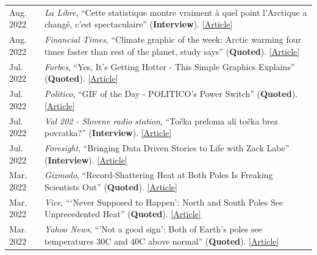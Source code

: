 \documentclass[margin,line,palatino,courier,10pt]{res}
\begin{document}
\begin{resume}
\begin{tabular}{@{}p{0.9in}p{4in}}
\end{tabular}
\begin{tabular}{@{}p{0.9in}p{4in}}
Aug. 2022 & \textit{La Libre}, ``Cette statistique montre vraiment \`{a} quel point l'Arctique a chang\'{e}, c'est spectaculaire'' (\textbf{Interview}). \href{https://www.lalibre.be/planete/environnement/2022/08/17/cette-statistique-montre-vraiment-a-quel-point-larctique-a-change-cest-spectaculaire-FGU5ABQZB5F6XINIL5ZBBB3CXM/}{[Article]}\\
Aug. 2022 & \textit{Financial Times}, ``Climate graphic of the week: Arctic warming four times faster than rest of the planet, study says'' (\textbf{Quoted}). \href{https://www.ft.com/content/9bb32c6f-b3dc-46bd-944e-9e583407b866}{[Article]}\\
Jul. 2022 & \textit{Forbes}, ``Yes, It’s Getting Hotter - This Simple Graphics Explains'' (\textbf{Quoted}). \href{https://www.forbes.com/sites/marshallshepherd/2022/07/19/yes-its-getting-hotterthis-simple-graphics-explains/}{[Article]}\\
Jul. 2022 & \textit{Politico}, ``GIF of the Day - POLITICO's Power Switch'' (\textbf{Quoted}). \href{https://www.politico.com/newsletters/power-switch/2022/07/15/time-for-bidens-beast-mode-00046061}{[Article]}\\
Jul. 2022 & \textit{Val 202 - Slovene radio station}, ``To\v{c}ka preloma ali to\v{c}ka brez povratka?'' (\textbf{Interview}). \href{https://val202.rtvslo.si/podkast/vroci-mikrofon/584/174886447}{[Article]}\\
Jul. 2022 & \textit{Foresight}, ``Bringing Data Driven Stories to Life with Zack Labe'' (\textbf{Interview}). \href{https://www.climateforesight.eu/interview/bringing-data-driven-stories-to-life-with-zack-labe/}{[Article]}\\
Mar. 2022 & \textit{Gizmodo}, ``Record-Shattering Heat at Both Poles Is Freaking Scientists Out'' (\textbf{Quoted}). \href{https://gizmodo.com/record-shattering-heat-at-both-poles-is-freaking-scient-1848687193}{[Article]}\\
Mar. 2022 & \textit{Vice}, ```Never Supposed to Happen': North and South Poles See Unprecedented Heat'' (\textbf{Quoted}). \href{https://www.vice.com/en/article/5dg4va/never-supposed-to-happen-north-and-south-poles-see-unprecedented-heat}{[Article]}\\
Mar. 2022 & \textit{Yahoo News}, ``'Not a good sign': Both of Earth’s poles see temperatures 30C and 40C above normal'' (\textbf{Quoted}). \href{https://news.yahoo.com/not-a-good-sign-both-of-earths-poles-see-temperatures-30-c-and-40-c-above-normal-155815110.html}{[Article]}\\

\end{tabular}
\end{resume}
\end{document}
